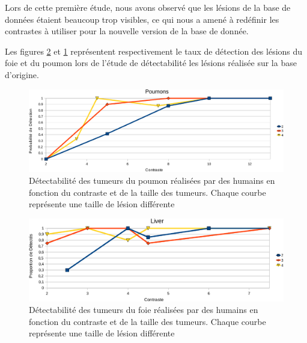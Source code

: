 Lors de cette première étude, nous avons observé que les lésions de la base de données étaient beaucoup trop visibles, ce qui nous a amené à redéfinir les contrastes à utiliser pour la nouvelle version de la base de donnée. 


Les figures \ref{fig:calibrationFoie} et \ref{fig:calibration} représentent respectivement le taux de détection des lésions du foie et du poumon lors de l'étude de détectabilité les lésions réalisée sur la base d'origine.


\begin{figure}[h!]
\begin{center}
\includegraphics[width=15cm]{images/calibration_crop}
\end{center}
\caption{Détectabilité des tumeurs du poumon réalisées par des humains en fonction du contraste et de la taille des tumeurs. Chaque courbe représente une taille de lésion différente} 
\label{fig:calibration}
\end{figure}

\begin{figure}[h!]
\begin{center}
\includegraphics[width=15cm]{images/calibrationFoie_crop}
\end{center}
\caption{Détectabilité des tumeurs du foie réalisées par des humains en fonction du contraste et de la taille des tumeurs. Chaque courbe représente une taille de lésion différente} 
\label{fig:calibrationFoie}
\end{figure}




